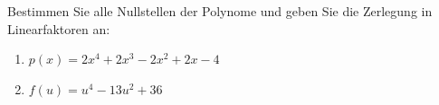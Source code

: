 \begin{ExerciseBlock}
Bestimmen Sie alle Nullstellen der Polynome und geben Sie die Zerlegung in Linearfaktoren an:
\begin{enumerate}[label=\alph*)]
\item $\displaystyle p(x) = 2 x^4 + 2 x^3 - 2 x^2 + 2 x - 4$

\item $\displaystyle f(u)=u^4-13u^2+36$
\end{enumerate}

\end{ExerciseBlock}
